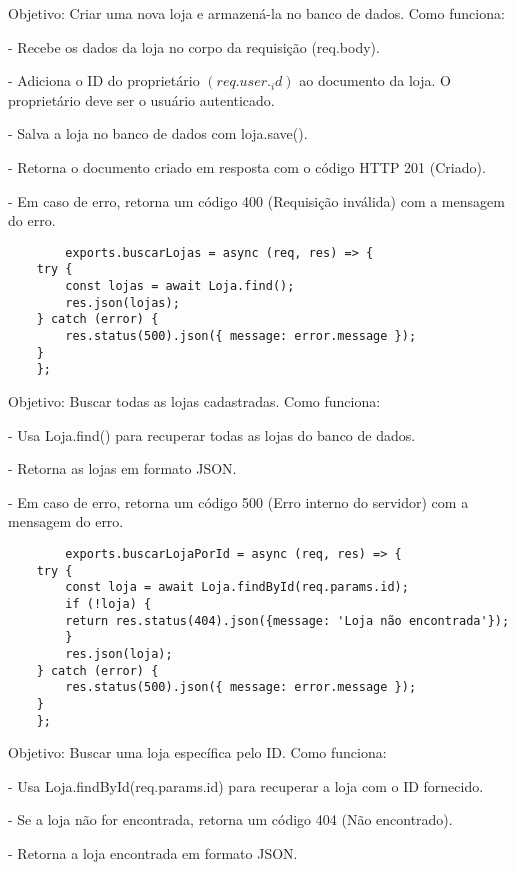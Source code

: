 Objetivo: Criar uma nova loja e armazená-la no banco de dados.
Como funciona:

- Recebe os dados da loja no corpo da requisição (req.body).

- Adiciona o ID do proprietário $(req.user._id)$ ao documento da loja. O proprietário deve ser o usuário autenticado.

- Salva a loja no banco de dados com loja.save().

- Retorna o documento criado em resposta com o código HTTP 201 (Criado).

- Em caso de erro, retorna um código 400 (Requisição inválida) com a mensagem do erro.

\vspace{1cm}
\begin{lstlisting}
        exports.buscarLojas = async (req, res) => {
    try {
        const lojas = await Loja.find();
        res.json(lojas);
    } catch (error) {
        res.status(500).json({ message: error.message });
    }
    };  
\end{lstlisting}
\vspace{1cm}

Objetivo: Buscar todas as lojas cadastradas.
Como funciona:

- Usa Loja.find() para recuperar todas as lojas do banco de dados.

- Retorna as lojas em formato JSON.

- Em caso de erro, retorna um código 500 (Erro interno do servidor) com a mensagem do erro.

\vspace{1cm}
\begin{lstlisting}
        exports.buscarLojaPorId = async (req, res) => {
    try {
        const loja = await Loja.findById(req.params.id);
        if (!loja) {
        return res.status(404).json({message: 'Loja não encontrada'});
        }
        res.json(loja);
    } catch (error) {
        res.status(500).json({ message: error.message });
    }
    };
\end{lstlisting}
\vspace{1cm}

Objetivo: Buscar uma loja específica pelo ID.
Como funciona:

- Usa Loja.findById(req.params.id) para recuperar a loja com o ID fornecido.

- Se a loja não for encontrada, retorna um código 404 (Não encontrado).

- Retorna a loja encontrada em formato JSON.

